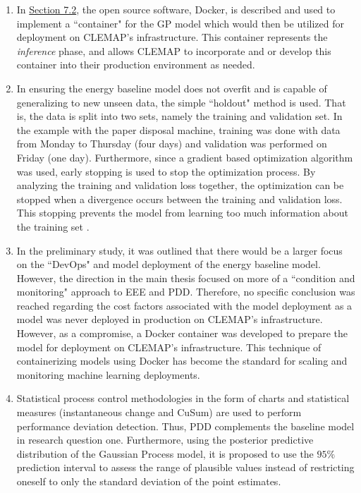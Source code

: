 \begin{enumerate}
    \item In \hyperlink{subsection.7.2}{Section 7.2}, the open source software, Docker, is described and used to implement a ``container" for the GP model which would then be utilized for deployment on CLEMAP's infrastructure. This container represents the \textit{inference} phase, and allows CLEMAP to incorporate and or develop this container into their production environment as needed.  
    
    \item In ensuring the energy baseline model does not overfit and is capable of generalizing to new unseen data, the simple ``holdout" method is used. That is, the data is split into two sets, namely the training and validation set. In the example with the paper disposal machine, training was done with data from Monday to Thursday (four days) and validation was performed on Friday (one day). Furthermore, since a gradient based optimization algorithm was used, early stopping is used to stop the optimization process. By analyzing the training and validation loss together, the optimization can be stopped when a divergence occurs between the training and validation loss. This stopping prevents the model from learning too much information about the training set \cite{pml1Book}. 
    
    \item In the preliminary study, it was outlined that there would be a larger focus on the ``DevOps" and model deployment of the energy baseline model. However, the direction in the main thesis focused on more of a ``condition and monitoring" approach to EEE and PDD. Therefore, no specific conclusion was reached regarding the cost factors associated with the model deployment as a model was never deployed in production on CLEMAP's infrastructure. However, as a compromise, a Docker container was developed to prepare the model for deployment on CLEMAP's infrastructure. This technique of containerizing models using Docker has become the standard for scaling and monitoring machine learning deployments. 
    
    \item Statistical process control methodologies in the form of charts and statistical measures (instantaneous change and CuSum) are used to perform performance deviation detection. Thus, PDD complements the baseline model in research question one. Furthermore, using the posterior predictive distribution of the Gaussian Process model, it is proposed to use the $95\%$ prediction interval to assess the range of plausible values instead of restricting oneself to only the standard deviation of the point estimates.  
    

\end{enumerate}
